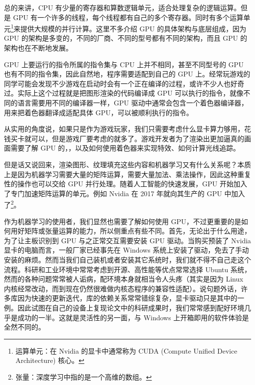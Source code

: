 总的来讲，CPU 有少量的寄存器和算数逻辑单元，适合处理复杂的逻辑运算。但是 GPU 有一个许多的线程，每个线程都有自己的多个寄存器。同时有多个运算单元\footnote{运算单元：在 Nvidia 的显卡中通常称为 CUDA (Compute Unified Device Architecture) 核心。}来提供大规模的并行计算。这里不多介绍 GPU 的具体架构与底层组成，因为 GPU 的架构是多变的，不同的厂商、不同的型号都有不同的架构，而且 GPU 的架构也在不断地发展。

GPU 上要运行的指令所属的指令集与 CPU 上并不相同，甚至不同型号的 GPU 也有不同的指令集，因此自然地，程序需要适配到自己的 GPU 上。经常玩游戏的同学可能会发现不少游戏在启动时会有一个正在编译的过程，或许不少人也好奇过。实际上这个过程就是把图形渲染的代码编译成 GPU 可以执行的指令，就像不同的语言需要用不同的编译器一样，GPU 驱动中通常会包含一个着色器编译器，用来把着色器翻译成适配具体 GPU，可以被顺利执行的指令。

从实用的角度说，如果只是作为游戏玩家，我们只需要考虑什么显卡算力够用，花钱买卡就可以，但是游戏厂要考虑的就多了。游戏开发者为了渲染出更加逼真的画面需要了解 GPU 的，，以及如何使用着色器来实现特效、如何计算光线追踪。

但是话又说回来，渲染图形、纹理填充这些内容和机器学习又有什么关系呢？本质上是因为机器学习需要大量的矩阵运算，需要大量加法、乘法操作，因此这种重复性的操作也可以交给 GPU 并行处理。随着人工智能的快速发展，GPU 开始加入了专门加速矩阵运算的单元。例如 Nvidia 在 2017 年就向其生产的 GPU 中加入了\footnote{张量：深度学习中指的是一个高维的数组。}。

作为机器学习的使用者，我们显然也需要了解如何使用 GPU，不过更重要的是如何用好矩阵或张量运算的能力，所以侧重点有些不同。首先，无论出于什么用途，为了让主板识别到 GPU 与之正常交互需要安装 GPU 驱动。当购买预装了 Nvidia 显卡的电脑而言，一般厂家已经事先在 Windows 系统上安装了驱动，免去了手动安装的麻烦。然而当我们自己装机或者安装其它系统时，我们就不得不自己走这个流程。科研和工业环境中常常考虑到开源、高性能等优点常常选择 Ubuntu 系统，然而的各种问题常常被人诟病，配环境本身就相当令人头疼（其实是因为 Linux 内核经常改动，而到现在仍然很难做内核态程序的兼容性适配）。说句题外话，许多库因为快速的更新迭代，库的依赖关系常常错综复杂，显卡驱动只是其中的一例。因此试图在自己的设备上复现论文中的科研成果时，我们常常感到配好环境几乎是成功的一半。这就是灵活性的另一面，与 Windows 上开箱即用的软件体验是全然不同的。

